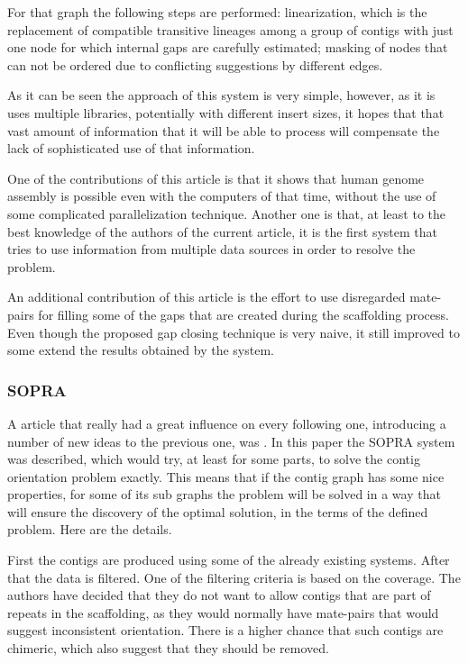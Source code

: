 \documentclass[11pt]{article}
\begin{document}
For that graph the following steps are performed: linearization, which is the
replacement of compatible transitive lineages among a group of contigs with just
one node for which internal gaps are carefully estimated; masking of nodes that
can not be ordered due to conflicting suggestions by different edges.

As it can be seen the approach of this system is very simple, however, as it is
uses multiple libraries, potentially with different insert sizes, it hopes that
that vast amount of information that it will be able to process will compensate
the lack of sophisticated use of that information.

One of the contributions of this article is that it shows that human genome
assembly is possible even with the computers of that time, without the use of
some complicated parallelization technique. Another one is that, at least to the
best knowledge of the authors of the current article, it is the first system
that tries to use information from multiple data sources in order to resolve the
problem.

An additional contribution of this article is the effort to use disregarded
mate-pairs for filling some of the gaps that are created during the scaffolding
process. Even though the proposed gap closing technique is very naive, it still
improved to some extend the results obtained by the system.

\subsubsection{SOPRA} %
\label{ssub:SOPRA}
A article that really had a great influence on every following one, introducing
a number of new ideas to the previous one, was \cite{SOPRA}. In this paper the
SOPRA system was described, which would try, at least for some parts, to solve
the contig orientation problem exactly. This means that if the contig graph has
some nice properties, for some of its sub graphs the problem will be solved in a
way that will ensure the discovery of the optimal solution, in the terms of the
defined problem. Here are the details.

First the contigs are produced using some of the already existing systems. After
that the data is filtered. One of the filtering criteria is based on the
coverage. The authors have decided that they do not want to allow contigs that
are part of repeats in the scaffolding, as they would normally have mate-pairs
that would suggest inconsistent orientation. There is a higher chance that such
contigs are chimeric, which also suggest that they should be removed.
\end{document}
